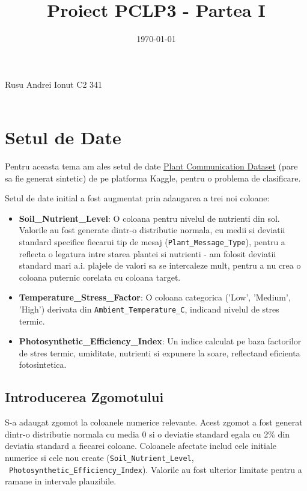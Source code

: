 \documentclass[11pt, a4paper]{article}
\title{Proiect PCLP3 - Partea I }
\date{\today}
\makeatletter
\newcommand{\studentname}{Rusu Andrei Ionut C2 341}
\renewcommand{\maketitle}{
  \begin{center}
    \Large \studentname \\
    \Huge \@title \\[1.5em]
    \large \@date
    \vspace{2em}
  \end{center}
  \par
  \thispagestyle{empty}
}
\makeatother
\begin{document}
\maketitle
\thispagestyle{empty}
\clearpage
{}

\section{Setul de Date}

Pentru aceasta tema am ales setul de date \href{https://www.kaggle.com/datasets/efeyldz/plant-communication-dataset-classification?resource=download}{Plant Communication Dataset} (pare sa fie generat sintetic) de pe platforma Kaggle, pentru o problema de clasificare.

Setul de date initial a fost augmentat prin adaugarea a trei noi coloane:
\sloppy
\begin{itemize}
    \item  \textbf{Soil\_Nutrient\_Level}: O coloana pentru nivelul de nutrienti din sol. Valorile au fost generate dintr-o distributie normala, cu medii si deviatii standard specifice fiecarui tip de mesaj (\texttt{Plant\_Message\_Type}), pentru a reflecta o legatura intre starea plantei si nutrienti - am folosit deviatii standard mari a.i. plajele de valori sa se intercaleze mult, pentru a nu crea o coloana puternic corelata cu coloana target.
    \item \textbf{Temperature\_Stress\_Factor}: O coloana categorica ('Low', 'Medium', 'High') derivata din \texttt{Ambient\_Temperature\_C}, indicand nivelul de stres termic.
    \item \textbf{Photosynthetic\_Efficiency\_Index}: Un indice calculat pe baza factorilor de stres termic, umiditate, nutrienti si expunere la soare, reflectand eficienta fotosintetica.
\end{itemize}

\subsection{Introducerea Zgomotului}
S-a adaugat zgomot la coloanele numerice relevante. Acest zgomot a fost generat dintr-o distributie normala cu media 0 si o deviatie standard egala cu 2\% din deviatia standard a fiecarei coloane. Coloanele afectate includ cele initiale numerice si cele nou create (\texttt{Soil\_Nutrient\_Level}, \  \texttt{Photosynthetic\_Efficiency\_Index}). Valorile au fost ulterior limitate pentru a ramane in intervale plauzibile.
\end{document}
